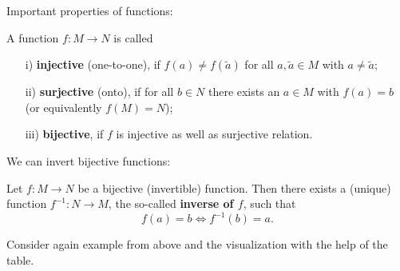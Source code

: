  
\begin{frame}
Important properties of functions: \vspace{-0.3cm}
\begin{defi} \label{def:injective_surjective_bijective}
	A function 	$f: M\to N$ is called
	\begin{itemize}
	\item[i)] \textbf{injective} (one-to-one), if $f(a)\not=f(\tilde a)$ for all $a,\tilde a\in M$ with $a\not=\tilde a$;
	\item[ii)] \textbf{surjective} (onto), if for all $b\in N$ there exists an $a\in M$ with $f(a)=b$ (or equivalently $f(M)=N$);
	\item[iii)] \textbf{bijective}, if $f$ is injective as well as surjective  relation.
	\end{itemize}
\end{defi}
%
\vspace{0.3cm}
We can invert bijective functions:\vspace{-0.3cm}
\begin{defi} \label{def:composition}
	Let $f\colon M\to N$ be a bijective (invertible) function. Then there exists a (unique) function $f^{-1}\colon N \to M$, the so-called \textbf{inverse of $f$}, such that
	$$f(a) = b \iff f^{-1}(b) = a.$$ 
\end{defi}
%
\vspace{0.3cm}
\begin{ex}
	\blank
 Consider again example from above and the visualization with the help of the table.
\end{ex}
\end{frame}

